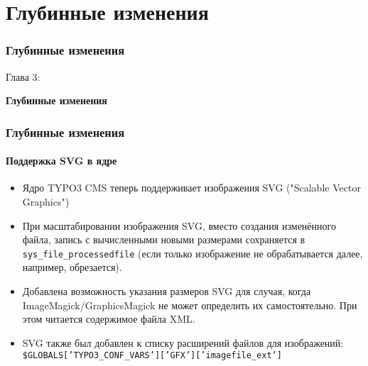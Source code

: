 %

\section{Глубинные изменения}
\begin{frame}[fragile]
	\frametitle{Глубинные изменения}

	\begin{center}\huge{Глава 3:}\end{center}
	\begin{center}\huge{\color{typo3darkgrey}\textbf{Глубинные изменения}}\end{center}

\end{frame}

\begin{frame}[fragile]
	\frametitle{Глубинные изменения}
	\framesubtitle{Поддержка SVG в ядре}

	\begin{itemize}
		\item Ядро TYPO3 CMS теперь поддерживает изображения SVG ("Scalable Vector Graphics")

		\item При масштабировании изображения SVG, вместо создания изменённого файла,
		запись с вычисленными новыми размерами сохраняется в \texttt{sys\_file\_processedfile}\newline
			\small(если только изображение не обрабатывается далее, например, обрезается)\normalsize.

		\item Добавлена возможность указания размеров SVG для случая, когда ImageMagick/GraphicsMagick
			не может определить их самостоятельно. При этом читается содержимое файла XML.

		\item SVG также был добавлен к списку расширений файлов для изображений:\newline
			\texttt{\$GLOBALS['TYPO3\_CONF\_VARS']['GFX']['imagefile\_ext']}

	\end{itemize}

\end{frame}

